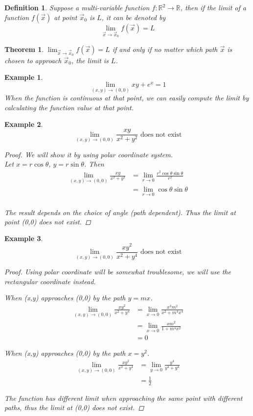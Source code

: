 \documentclass{article}
\newtheorem{definition}{Definition}
\newtheorem{ex}{Example}
\newtheorem{thm}{Theorem}
\begin{document}
\begin{definition}
	Suppose a multi-variable function $f:\mathbb{R}^2\to\mathbb{R}$, then if the limit of a function $f(\vec{x})$ at point $\vec{x}_0$ is $L$, it can be denoted by
	\[ \lim_{\vec{x}\to\vec{x}_0} f(\vec{x}) = L \] 
\end{definition}

\begin{thm}
	$\lim_{\vec{x}\to\vec{x}_0} f(\vec{x}) = L $ if and only if no matter which path $\vec{x}$ is chosen to approach $\vec{x}_0$, the limit is $L$.
\end{thm}

\begin{ex}
	\[ \lim_{(x,y)\to (0,0)} xy + e^x = 1 \]
	When the function is continuous at that point, we can easily compute the limit by calculating the function value at that point.
\end{ex}

\begin{ex}
	\[ \lim_{(x,y)\to(0,0)} \frac{xy}{x^2+y^2}\text{ does not exist} \]
	\begin{proof}
		We will show it by using polar coordinate system.\\
		Let $x=r\cos\theta$, $y=r\sin\theta$. Then
		\begin{align*}
		\lim_{(x,y)\to(0,0)} \frac{xy}{x^2+y^2} 
		&= \lim_{r\to 0} \frac{r^2\cos\theta\sin\theta}{r^2}\\
		&= \lim_{r\to 0} \cos\theta\sin\theta\\
		\end{align*}
		
		The result depends on the choice of angle (path dependent). Thus the limit at point (0,0) does not exist. 
	\end{proof}
\end{ex}

\begin{ex}
	\[ \lim_{(x,y)\to(0,0)} \frac{xy^2}{x^2+y^4}\text{ does not exist} \]
	\begin{proof}
		Using polar coordinate will be somewhat troublesome, we will use the rectangular coordinate instead.
		
		When (x,y) approaches (0,0) by the path $y=mx$.
		\begin{align*}
		\lim_{(x,y)\to(0,0)} \frac{xy^2}{x^2+y^4}
		&= \lim_{x\to 0} \frac{x^3m^2}{x^2+m^4x^4}\\
		&= \lim_{x\to 0} \frac{xm^2}{1+m^4x^2}\\
		&= 0
		\end{align*}
		
		When (x,y) approaches (0,0) by the path $x=y^2$.
		\begin{align*}
		\lim_{(x,y)\to(0,0)} \frac{xy^2}{x^2+y^4}
		&= \lim_{y\to 0} \frac{y^4}{y^4+y^4}\\
		&= \frac{1}{2}
		\end{align*}
		
		The function has different limit when approaching the same point with different paths, thus the limit at (0,0) does not exist.
	\end{proof}
\end{ex}
\end{document}
